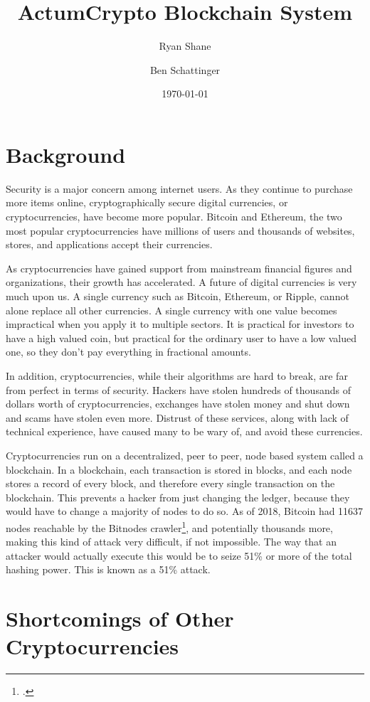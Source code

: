 \documentclass[letter]{article}
\title{ActumCrypto Blockchain System}
\author{Ryan Shane}
\affil{Creator/Developer, ActumCrypto}
\author{Ben Schattinger}
\affil{Typesetter}
\date{\today}
\begin{document}
\maketitle

\section{Background}
Security is a major concern among internet users. As they continue to purchase more items online, cryptographically secure digital currencies, or cryptocurrencies, have become more popular. Bitcoin and Ethereum, the two most popular cryptocurrencies have millions of users and thousands of websites, stores, and applications accept their currencies.

As cryptocurrencies have gained support from mainstream financial figures and organizations, their growth has accelerated. A future of digital currencies is very much upon us. A single currency such as Bitcoin, Ethereum, or Ripple, cannot alone replace all other currencies. A single currency with one value becomes impractical when you apply it to multiple sectors. It is practical for investors to have a high valued coin, but practical for the ordinary user to have a low valued one, so they don’t pay everything in fractional amounts.

In addition, cryptocurrencies, while their algorithms are hard to break, are far from perfect in terms of security. Hackers have stolen hundreds of thousands of dollars worth of cryptocurrencies, exchanges have stolen money and shut down and scams have stolen even more. Distrust of these services, along with lack of technical experience, have caused many to be wary of, and avoid these currencies.

Cryptocurrencies run on a decentralized, peer to peer, node based system called a blockchain. In a blockchain, each transaction is stored in blocks, and each node stores a record of every block, and therefore every single transaction on the blockchain. This prevents a hacker from just changing the ledger, because they would have to change a majority of nodes to do so. As of 2018, Bitcoin had 11637 nodes reachable by the Bitnodes crawler\footcite{bitnodes}, and potentially thousands more, making this kind of attack very difficult, if not impossible. The way that an attacker would actually execute this would be to seize 51\% or more of the total hashing power. This is known as a 51\% attack.

\section{Shortcomings of Other Cryptocurrencies}
\end{document}

